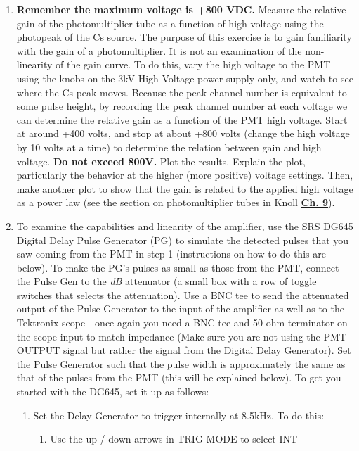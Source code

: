 \documentclass{../lab}
\begin{document}
\begin{enumerate}
    \item \textbf{Remember the maximum voltage is +800 VDC.} Measure the relative gain of the photomultiplier tube as a function of high voltage using the photopeak of the Cs source. The purpose of this exercise is to gain familiarity with the gain of a photomultiplier. It is not an examination of the non-linearity of the gain curve. To do this, vary the high voltage to the PMT using the knobs on the 3kV High Voltage power supply only, and watch to see where the Cs peak moves. Because the peak channel number is equivalent to some pulse height, by recording the peak channel number at each voltage we can determine the relative gain as a function of the PMT high voltage. Start at around +400 volts, and stop at about +800 volts (change the high voltage by 10 volts at a time) to determine the relation between gain and high voltage. \textbf{Do not exceed 800V.} Plot the results. Explain the plot, particularly the behavior at the higher (more positive) voltage settings. Then, make another plot to show that the gain is related to the applied high voltage as a power law (see the section on photomultiplier tubes in Knoll \href{https://drive.google.com/file/d/1QlRsQWBkbyqGFFVmDlOfvCZZXB-VXkUy/view?usp=drive_link}{\textbf{Ch. 9}}).

    \item To examine the capabilities and linearity of the amplifier, use the SRS DG645 Digital Delay Pulse Generator (PG) to simulate the detected pulses that you saw coming from the PMT in step 1 (instructions on how to do this are below). To make the PG's pulses as small as those from the PMT, connect the Pulse Gen to the \emph{dB} attenuator (a small box with a row of toggle switches that selects the attenuation). Use a BNC tee to send the attenuated output of the Pulse Generator to the input of the amplifier as well as to the Tektronix scope - once again you need a BNC tee and 50 ohm terminator on the scope-input to match impedance (Make sure you are not using the PMT OUTPUT signal but rather the signal from the Digital Delay Generator). Set the Pulse Generator such that the pulse width is approximately the same as that of the pulses from the PMT (this will be explained below). To get you started with the DG645, set it up as follows:
    \begin{enumerate}
        \item Set the Delay Generator to trigger internally at 8.5kHz. To do this:
        \begin{enumerate}
            \item Use the up / down arrows in TRIG MODE to select INT


\end{enumerate}
\end{enumerate}
\end{enumerate}
\end{document}
